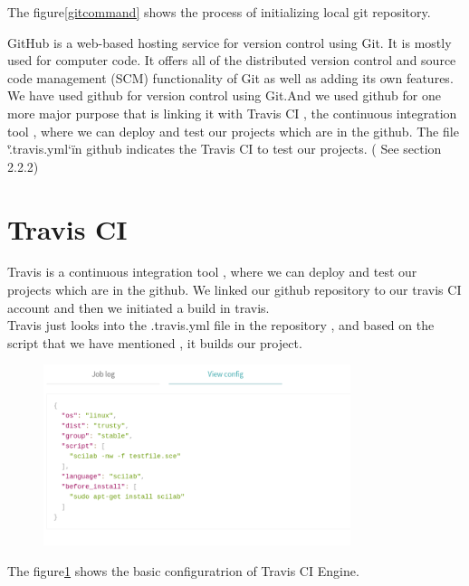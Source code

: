 \documentclass[12pt,a4paper]{report}
\begin{document}
The figure\ref{gitcommand} shows the process of initializing local git repository.


GitHub is a web-based hosting service for version control using Git.  It is mostly used for computer code. It offers all of the distributed version control and source code management (SCM) functionality of Git as well as adding its own features.\\

We have used github for version control using Git.And we used github for one more major purpose that is linking it with Travis CI , the continuous integration tool , where we can deploy and test our projects which are in the github. The file \char`\".travis.yml\char`\" in github indicates the Travis CI to test our projects. ( See section 2.2.2)\\


\section{Travis CI}
Travis is a continuous integration tool , where we can deploy and test our projects which are in the github. We linked our github repository to our travis CI account and then we initiated a build in travis.\\

Travis just looks into the .travis.yml file in the repository , and based on the script that we have mentioned , it builds our project.\\

\begin{figure}[H]
\centering
\includegraphics[width = 0.8\textwidth]{travisconfig.png}
\label{travisci}
\end{figure}
The figure\ref{travisci} shows the basic configuratrion of Travis CI Engine.\\
\end{document}

